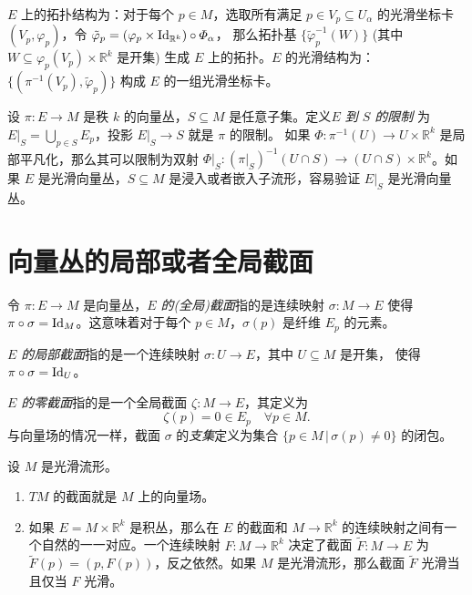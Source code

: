 \begin{remark}
  $E$ 上的拓扑结构为：对于每个 $p\in M$，选取所有满足 $p\in V_p\subseteq U_\alpha$
  的光滑坐标卡 $(V_p,\varphi_p)$，令 $\tilde\varphi_p=(\varphi_p\times \operatorname{Id}_{\mathbb{R}^k})\circ\varPhi_\alpha$，
  那么拓扑基 $\{\tilde\varphi_p^{-1}(W)\}$ (其中 $W\subseteq \varphi_p(V_p)\times \mathbb{R}^k$ 是开集)
  生成 $E$ 上的拓扑。$E$ 的光滑结构为：$\{(\pi^{-1}(V_p),\tilde\varphi_p)\}$
  构成 $E$ 的一组光滑坐标卡。
\end{remark} 


\begin{example}[向量丛的限制]
  设 $\pi:E\to M$ 是秩 $k$ 的向量丛，$S\subseteq M$ 是任意子集。定义\emph{$E$ 到 $S$ 的限制}
  为 $E|_S=\bigcup_{p\in S}E_p$，投影 $E|_S\to S$ 就是 $\pi$ 的限制。
  如果 $\varPhi:\pi^{-1}(U)\to U\times \mathbb{R}^k$ 是局部平凡化，那么其可以限制为双射
  $\varPhi|_S:(\pi|_S)^{-1}(U\cap S)\to (U\cap S)\times \mathbb{R}^k$。如果 $E$
  是光滑向量丛，$S\subseteq M$ 是浸入或者嵌入子流形，容易验证 $E|_S$ 是光滑向量丛。
\end{example}

\section{向量丛的局部或者全局截面}

令 $\pi:E\to M$ 是向量丛，\emph{$E$ 的(全局)截面}指的是连续映射 $\sigma:M\to E$ 使得
$\pi\circ\sigma=\operatorname{Id}_M$。这意味着对于每个 $p\in M$，$\sigma(p)$ 是纤维 $E_p$ 的元素。

\emph{$E$ 的局部截面}指的是一个连续映射 $\sigma:U\to E$，其中 $U\subseteq M$ 是开集，
使得 $\pi\circ\sigma=\operatorname{Id}_U$。

\emph{$E$ 的零截面}指的是一个全局截面 $\zeta:M\to E$，其定义为
\[
  \zeta(p)=0\in E_p\quad \forall p\in M.
\]
与向量场的情况一样，截面 $\sigma$ 的\emph{支集}定义为集合 $\{p\in M\,|\, \sigma(p)\neq 0\}$ 的闭包。

\begin{example}[向量丛的截面]
  设 $M$ 是光滑流形。
  \begin{enumerate}
    \item $TM$ 的截面就是 $M$ 上的向量场。
    \item 如果 $E=M\times \mathbb{R}^k$ 是积丛，那么在 $E$ 的截面和
    $M\to \mathbb{R}^k$ 的连续映射之间有一个自然的一一对应。一个连续映射 $F:M\to \mathbb{R}^k$
    决定了截面 $\tilde F:M\to E$ 为 $\tilde F(p)=(p,F(p))$，反之依然。如果 $M$
    是光滑流形，那么截面 $\tilde F$ 光滑当且仅当 $F$ 光滑。
  \end{enumerate}
\end{example}

